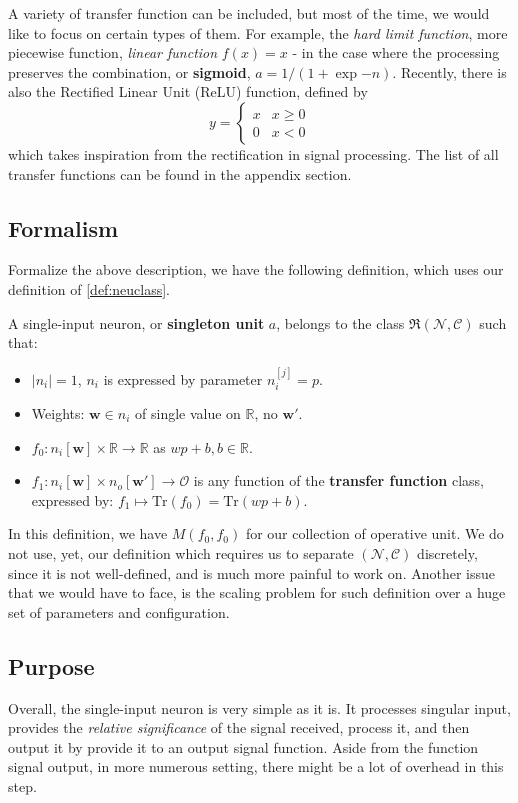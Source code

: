 A variety of transfer function can be included, but most of the time, we would like to focus on certain types of them. For example, the \textit{hard limit function}, more piecewise function, \textit{linear function} $f(x)=x$ - in the case where the processing preserves the combination, or \textbf{sigmoid}, $a=1/(1+\exp{-n})$. Recently, there is also the Rectified Linear Unit (ReLU) function, defined by $$y=\begin{cases}
x & x \geq 0  \\
0 & x < 0
\end{cases}$$
which takes inspiration from the rectification in signal processing. The list of all transfer functions can be found in the appendix section. 
\subsection{Formalism}

Formalize the above description, we have the following definition, which uses our definition of \ref{def:neuclass}. 
\begin{definition}
    A single-input neuron, or \textbf{singleton unit} $a$, belongs to the class $\mathfrak{R}(\mathcal{N},\mathcal{C})$ such that: 
    \begin{itemize}
        \item $\lvert n_i \rvert=1$, $n_i$ is expressed by parameter $n_{i}^{[j]}=p$.
        \item Weights: $\mathbf{w}\in n_i$ of single value on $\mathbb{R}$, no $\mathbf{w}'$. 
        \item $f_{0}:n_{i}[\mathbf{w}]\times \mathbb{R}\to \mathbb{R}$ as $wp+b, b\in \mathbb{R}$. 
        \item $f_{1}:n_{i}[\mathbf{w}]\times n_{o}[\mathbf{w}']\to\mathcal{O}$ is any function of the \textbf{transfer function} class, expressed by: $f_{1}\mapsto \mathrm{Tr}(f_{0})= \mathrm{Tr}(wp+b)$. 
    \end{itemize}
\end{definition}

In this definition, we have $M(f_0, f_0)$ for our collection of operative unit. We do not use, yet, our definition which requires us to separate $(\mathcal{N},\mathcal{C})$ discretely, since it is not well-defined, and is much more painful to work on. Another issue that we would have to face, is the scaling problem for such definition over a huge set of parameters and configuration. 

\subsection{Purpose}
Overall, the single-input neuron is very simple as it is. It processes singular input, provides the \textit{relative significance} of the signal received, process it, and then output it by provide it to an output signal function. Aside from the function signal output, in more numerous setting, there might be a lot of overhead in this step. 

